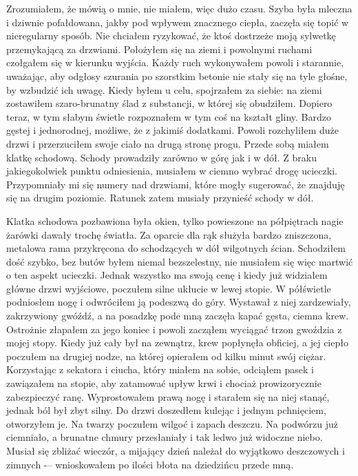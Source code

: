 Zrozumiałem, że mówią o mnie, nie miałem, więc dużo czasu. Szyba była mleczna i dziwnie pofałdowana, jakby pod wpływem znacznego ciepła, zaczęła się topić w nieregularny sposób. Nie chciałem ryzykować, że ktoś dostrzeże moją sylwetkę przemykającą za drzwiami. Położyłem się na ziemi i powolnymi ruchami czołgałem się w kierunku wyjścia. Każdy ruch wykonywałem powoli i starannie, uważając, aby odgłosy szurania po szorstkim betonie nie stały się na tyle głośne, by wzbudzić ich uwagę. Kiedy byłem u celu, spojrzałem za siebie: na ziemi zostawiłem szaro-brunatny ślad z substancji, w której się obudziłem. Dopiero teraz, w tym słabym świetle rozpoznałem w tym coś na kształt gliny. Bardzo gęstej i jednorodnej, możliwe, że z jakimiś dodatkami. Powoli rozchyliłem duże drzwi i przerzuciłem swoje ciało na drugą stronę progu. Przede sobą miałem klatkę schodową. Schody prowadziły zarówno w górę jak i w dół. Z braku jakiegokolwiek punktu odniesienia, musiałem w ciemno wybrać drogę ucieczki. Przypomniały mi się numery nad drzwiami, które mogły sugerować, że znajduję się na drugim poziomie. Ratunek zatem musiały przynieść schody w dół.

Klatka schodowa pozbawiona była okien, tylko powieszone na półpiętrach nagie żarówki dawały trochę światła. Za oparcie dla rąk służyła bardzo zniszczona, metalowa rama przykręcona do schodzących w dół wilgotnych ścian. Schodziłem dość szybko, bez butów byłem niemal bezszelestny, nie musiałem się więc martwić o ten aspekt ucieczki. Jednak wszystko ma swoją cenę i kiedy już widziałem główne drzwi wyjściowe, poczułem silne ukłucie w lewej stopie. W półświetle podniosłem nogę i odwróciłem ją podeszwą do góry. Wystawał z niej zardzewiały, zakrzywiony gwóźdź, a na posadzkę pode mną zaczęła kapać gęsta, ciemna krew. Ostrożnie złapałem za jego koniec i powoli zacząłem wyciągać trzon gwoździa z mojej stopy. Kiedy już cały był na zewnątrz, krew popłynęła obficiej, a jej ciepło poczułem na drugiej nodze, na której opierałem od kilku minut swój ciężar. Korzystając z sekatora i ciucha, który miałem na sobie, odciąłem pasek i zawiązałem na stopie, aby zatamować upływ krwi i chociaż prowizorycznie zabezpieczyć ranę. Wyprostowałem prawą nogę i starałem się na niej stanąć, jednak ból był zbyt silny. Do drzwi doszedłem kulejąc i jednym pchnięciem, otworzyłem je. Na twarzy poczułem wilgoć i zapach deszczu. Na podwórzu już ciemniało, a brunatne chmury przesłaniały i tak ledwo już widoczne niebo. Musiał się zbliżać wieczór, a mijający dzień należał do wyjątkowo deszczowych i zimnych -– wnioskowałem po ilości błota na dziedzińcu przede mną.

